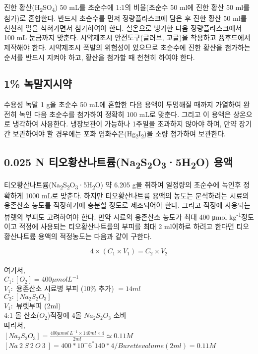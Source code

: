 \documentclass[
]{book}
\begin{document}
진한 황산(H\textsubscript{2}SO\textsubscript{4}) 50 mL를 초순수에 1:1의 비율(초순수 50 ml에 진한 황산 50 ml를 첨가)로 혼합한다. 반드시 초순수를 먼저 정량플라스크에 담은 후 진한 황산 50 ml를 천천히 열을 식혀가면서 첨가하여야 한다. 실온으로 냉가한 다음 정량플라스크에서 100 mL 눈금까지 맞춘다. 시약제조시 안전도구(글러브, 고글)을 착용하고 퓸후드에서 제작해야 한다. 시약제조시 폭발의 위험성이 있으므로 초순수에 진한 황산을 첨가하는 순서를 반드시 지켜야 하고, 황산을 첨가할 때 천천히 하여야 한다.

\hypertarget{uxb179uxb9d0uxc9c0uxc2dcuxc57d-1}{%
\subsection{1\% 녹말지시약}\label{uxb179uxb9d0uxc9c0uxc2dcuxc57d-1}}

수용성 녹말 1 g을 초순수 50 mL에 혼합한 다음 용액이 투명해질 때까지 가열하여 완전히 녹인 다음 초순수를 첨가하여 정확히 100 mL로 맞춘다. 그리고 이 용액은 상온으로 냉각하여 사용한다. 냉장보관이 가능하나 1주일을 초과하지 않아야 하며, 만약 장기간 보관하여야 할 경우에는 포화 염화수은(Hg\textsubscript{2}I\textsubscript{2})을 소량 첨가하여 보관한다.

\hypertarget{n-uxd2f0uxc624uxd669uxc0b0uxb098uxd2b8uxb968na2s2o35h2o-uxc6a9uxc561}{%
\subsection{\texorpdfstring{0.025 N 티오황산나트륨(Na\textsubscript{2}S\textsubscript{2}O\textsubscript{3}·5H\textsubscript{2}O) 용액}{0.025 N 티오황산나트륨(Na2S2O3·5H2O) 용액}}\label{n-uxd2f0uxc624uxd669uxc0b0uxb098uxd2b8uxb968na2s2o35h2o-uxc6a9uxc561}}

티오황산나트륨(Na\textsubscript{2}S\textsubscript{2}O\textsubscript{3}·5H\textsubscript{2}O) 약 6.205 g을 취하여 일정량의 초순수에 녹인후 정확하게 1000 mL로 맞춘다. 하지만 티오황산나트륨 용액의 농도는 분석하려는 시료의 용존산소 농도를 적정하기에 충분할 정도로 제조되어야 한다. 그리고 적정에 사용되는 뷰렛의 부피도 고려하여야 한다. 만약 시료의 용존산소 농도가 최대 400 μmol kg\textsuperscript{-1}정도이고 적정에 사용되는 티오황산나트륨의 부피를 최대 2 ml이하로 하려고 한다면 티오황산나트륨 용액의 적정농도는 다음과 같이 구한다.

\[4 \times (C_{1} \times V_{1}) = C_{2} \times V_{2}\]\\
여기서,\\
\(C_{1}: [O_{2}]=400 \mu mol L^{-1}\)\\
\(V_{1}:\) 용존산소 시료병 부피 (10\% 추가) \(=14ml\)\\
\(C_{2}: [Na_{2}S_{2}O_{3}]\)\\
\(V_{1}:\) 뷰렛부피 (2ml)\\
4:1 몰 산소(\(O_{2}\))적정에 4몰 \(Na_{2}S_{2}O_{3}\) 소비\\
따라서,\\
\([Na_{2}S_{2}O_{3}]=\frac{400 \mu mol ~ L^{-1} \times 140ml \times 4}{2ml} \simeq 0.11M\)\\
\([Na~2~S~2~O~3~]=400 * 10^-6^ * 140 * 4 / Burette volume (2 ml) = 0.11M\)
\end{document}
